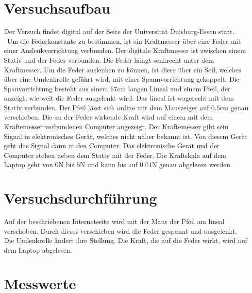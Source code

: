 %

%
\section{Versuchsaufbau}
Der Versuch findet digital auf der Seite der Universität Duisburg-Essen 
\cite{Hook_Interaktiv} statt. \
Um die Federkonstante zu bestimmen, ist ein Kraftmesser über eine Feder mit einer Auslenkvorrichtung verbunden.
Der digitale Kraftmesser ist zwischen einem Stativ und der Feder verbunden. Die Feder hängt senkrecht unter dem Kraftmesser.
Um die Feder auslenken zu können, ist diese über ein Seil, welches über eine Umlenkrolle geführt wird, mit einer 
Spannvorrichtung gekoppelt. Die Spanvorrichtung besteht aus einem $67 \unit{\centi \meter}$ langen Lineal und einem Pfeil, 
der anzeigt, wie weit die Feder ausgelenkt wird. Das lineal ist wagerecht mit dem Stativ verbunden. Der Pfeil lässt sich online 
mit dem Mauszeiger auf $0.5 \unit{\centi \meter}$ genau verschieben. %
Die an der Feder wirkende Kraft wird auf einem mit dem Kräftemesser verbundenen Computer angezeigt. Der Kräftemesser 
gibt sein Signal in elektronisches Gerät, welches nicht näher bekannt ist. Von diesem Gerät geht das Signal dann in den 
Computer. Das elektronische Gerät und der Computer stehen neben dem Stativ mit der Feder. Die Kraftskala auf dem Laptop geht 
von $0 \unit{\newton}$ bis $5 \unit{\newton}$ und kann bis auf $0.01 \unit{\newton}$ genau abgelesen werden


\section{Versuchsdurchführung}
\label{sec:Versuhsdurchfuehrung}
Auf der beschriebenen Internetseite wird mit der Maus der Pfeil am lineal verschoben. Durch dieses verschieben wird die Feder 
gespannt und ausgelenkt. Die Umlenkrolle ändert ihre Stellung. Die Kraft, die auf die Feder wirkt, wird auf dem Laptop 
abgelesen.

\section{Messwerte}




%

